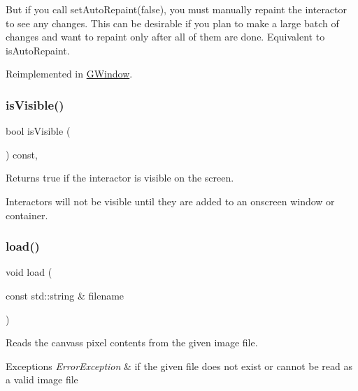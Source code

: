 But if you call set\+Auto\+Repaint(false), you must manually repaint the interactor to see any changes. This can be desirable if you plan to make a large batch of changes and want to repaint only after all of them are done. Equivalent to is\+Auto\+Repaint. 

Reimplemented in \mbox{\hyperlink{classGWindow_a45b1955433b8bf8a449a216b847d87f7}{G\+Window}}.

\mbox{\label{classGInteractor_a9d8a6cfb13917785c143e74d40e4e2be}} 
\subsubsection{\texorpdfstring{is\+Visible()}{isVisible()}}
{\footnotesize\ttfamily bool is\+Visible (\begin{DoxyParamCaption}{ }\end{DoxyParamCaption}) const\hspace{0.3cm}{\ttfamily [virtual]}, {\ttfamily [inherited]}}



Returns true if the interactor is visible on the screen. 

Interactors will not be visible until they are added to an onscreen window or container. \mbox{\label{classGCanvas_a6c21edd9d285c925527e3209fca54b01}} 
\subsubsection{\texorpdfstring{load()}{load()}}
{\footnotesize\ttfamily void load (\begin{DoxyParamCaption}\item[{const std\+::string \&}]{filename }\end{DoxyParamCaption})\hspace{0.3cm}{\ttfamily [virtual]}}



Reads the canvas\textquotesingle{}s pixel contents from the given image file. 


\begin{DoxyExceptions}{Exceptions}
{\em Error\+Exception} & if the given file does not exist or cannot be read as a valid image file \\
\hline
\end{DoxyExceptions}
\mbox{\label{classGCanvas_a49dc57a2ce4caa354a5fff6acdde2e7d}} 
